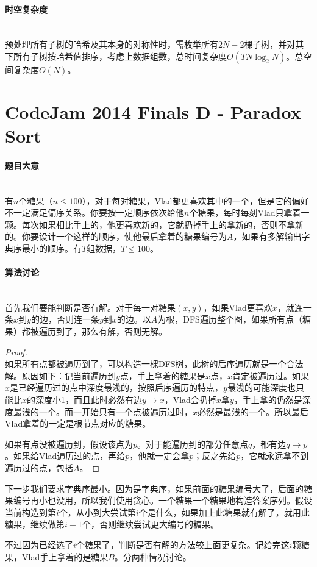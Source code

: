 \documentclass[UTF8]{ctexart}
\newcommand{\myparagraph}[1]{\paragraph{#1}\mbox{}\\}
\theoremstyle{nonumberplain}
\newtheorem{proof}{\hspace{1em}证明：}
\begin{document}
		\myparagraph{时空复杂度}
	
			预处理所有子树的哈希及其本身的对称性时，需枚举所有$2N-2$棵子树，并对其下所有子树按哈希值排序，考虑上数据组数，总时间复杂度$O(TN\log_2N)$。总空间复杂度$O(N)$。
	
	\section{CodeJam 2014 Finals D - Paradox Sort}
	
		\myparagraph{题目大意}
		
			有$n$个糖果（$n \leq 100$），对于每对糖果，Vlad都更喜欢其中的一个，但是它的偏好不一定满足偏序关系。你要按一定顺序依次给他$n$个糖果，每时每刻Vlad只拿着一颗。每次如果相比手上的，他更喜欢新的，它就扔掉手上的拿新的，否则不拿新的。你要设计一个这样的顺序，使他最后拿着的糖果编号为$A$，如果有多解输出字典序最小的顺序。有$T$组数据，$T \leq 100$。
		
		\myparagraph{算法讨论}
		
			首先我们要能判断是否有解。对于每一对糖果$(x,y)$，如果Vlad更喜欢$x$，就连一条$x$到$y$的边，否则连一条$y$到$x$的边。以$A$为根，DFS遍历整个图，如果所有点（糖果）都被遍历到了，那么有解，否则无解。
			
			\begin{proof}\mbox{}\\
			
				如果所有点都被遍历到了，可以构造一棵DFS树，此树的后序遍历就是一个合法解。原因如下：记当前遍历到$y$点，手上拿着的糖果是$x$点，$x$肯定被遍历过。如果$x$是已经遍历过的点中深度最浅的，按照后序遍历的特点，$y$最浅的可能深度也只能比$x$的深度小1，而且此时必然有边$y \to x$，Vlad会扔掉$x$拿$y$，手上拿的仍然是深度最浅的一个。而一开始只有一个点被遍历过时，$x$必然是最浅的一个。所以最后Vlad拿着的一定是根节点对应的糖果。
				
				如果有点没被遍历到，假设该点为$p$。对于能遍历到的部分任意点$q$，都有边$q \to p$。如果给Vlad遍历过的点，再给$p$，他就一定会拿$p$；反之先给$p$，它就永远拿不到遍历过的点，包括$A$。
				
			\end{proof}
			
			下一步我们要求字典序最小。因为是字典序，如果前面的糖果编号大了，后面的糖果编号再小也没用，所以我们使用贪心。一个糖果一个糖果地构造答案序列。假设当前构造到第$i$个，从小到大尝试第$i$个是什么，如果加上此糖果就有解了，就用此糖果，继续做第$i+1$个，否则继续尝试更大编号的糖果。
			
			不过因为已经选了$i$个糖果了，判断是否有解的方法较上面更复杂。记给完这$i$颗糖果，Vlad手上拿着的是糖果$B$。分两种情况讨论。
			
\end{document}
